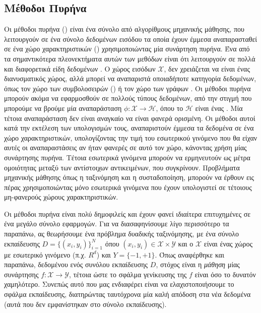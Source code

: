 \subsection{Μέθοδοι Πυρήνα}
Οι μέθοδοι πυρήνα () είναι ένα σύνολο από αλγορίθμους μηχανικής μάθησης, που λειτουργούν σε ένα σύνολο δεδομένων εισόδου τα οποία έχουν έμμεσα αναπαρασταθεί σε ένα χώρο χαρακτηριστικών () χρησιμοποιώντας μία συνάρτηση πυρήνα.
Ένα από τα σημαντικότερα πλεονεκτήματα αυτών των μεθόδων είναι ότι λειτουργούν σε πολλά και διαφορετικά είδη δεδομένων \cite{ScholkopfSmolaLK}.
Ο χώρος εισόδων $\mathcal{X}$, δεν χρειάζεται να είναι ένας διανυσματικός χώρος, αλλά μπορεί να αναπαριστά οποιαδήποτε κατηγορία δεδομένων, όπως τον χώρο των συμβολοσειρών () ή τον χώρο των γράφων \cite{GartnerSKSD}.
Οι μέθοδοι πυρήνα μπορούν ακόμα να εφαρμοσθούν σε πολλούς τύπους δεδομένων, από την στιγμή που μπορούμε να βρούμε μία αναπαράσταση $\phi : \mathcal{X} \rightarrow \mathcal{H}$, όπου το $\mathcal{H}$ είναι ένας .
Μία τέτοια αναπαράσταση δεν είναι αναγκαίο να είναι φανερά ορισμένη.
Οι μέθοδοι αυτοί κατά την εκτέλεση των υπολογισμών τους, αναπαριστούν έμμεσα τα δεδομένα σε ένα χώρο χαρακτηριστικών, υπολογίζοντας την τιμή του εσωτερικού γινόμενο που θα είχαν αυτές οι αναπαραστάσεις αν ήταν φανερές σε αυτό τον χώρο, κάνοντας χρήση μίας συνάρτησης πυρήνα.
Τέτοια εσωτερικά γινόμενα μπορούν να ερμηνευτούν ως μέτρα ομοιότητας μεταξύ των αντίστοιχων αντικειμένων, που συγκρίνουν.
Προβλήματα μηχανικής μάθησης όπως η ταξινόμηση και η συσταδοποίηση, μπορούν να έρθουν εις πέρας χρησιμοποιώντας μόνο εσωτερικά γινόμενα που έχουν υπολογιστεί σε τέτοιους μη-φανερούς χώρους χαρακτηριστικών.\par
Οι μέθοδοι πυρήνα είναι πολύ δημοφιλείς και έχουν φανεί ιδιαίτερα επιτυχημένες σε ένα μεγάλο σύνολο εφαρμογών.
Για να διασαφηνίσουμε λίγο περισσότερο τα παραπάνω, ας θεωρήσουμε ένα πρόβλημα δυαδικής ταξινόμησης, με ένα σύνολο εκπαίδευσης $D = \{( x_{i}, y_{i})\}^{Ν}_{i = 1}$ όπου $(x_{i}, y_{i}) \in \mathcal{X} \times \mathcal{Y}$ και ο $\mathcal{X}$ είναι ένας χώρος με εσωτερικό γινόμενο (π.χ. $R^{d}$) και $Y = \{-1, +1\}$.
Όπως αναφέρθηκε και παραπάνω, δεδομένου ενός συνόλου εκπαίδευσης $D$, στόχος είναι η \textit{μάθηση} μίας συνάρτησης $f : \mathcal{X} \rightarrow \mathcal{Y}$, τέτοια ώστε το σφάλμα γενίκευσης της $f$ είναι όσο το δυνατόν χαμηλότερο.
Συνεπώς αυτό που μας ενδιαφέρει είναι να ελαχιστοποιήσουμε το σφάλμα εκπαίδευσης, διατηρώντας ταυτόχρονα μία καλή απόδοση στα νέα δεδομένα (αυτά που δεν εμφανίστηκαν στο σύνολο εκπαίδευσης).

